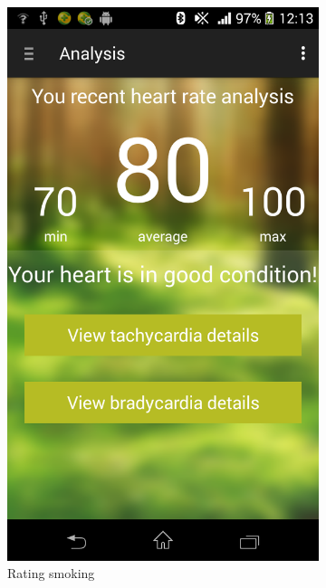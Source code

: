 \begin{figure}
\begin{subfigure}{.24\textwidth}
  \includegraphics[width=.8\linewidth]{img/screenshot/ss4.png}
  \caption{Rating smoking}
\end{subfigure}
\begin{subfigure}{.24\textwidth}
  \centering

\end{subfigure}
\end{figure}
